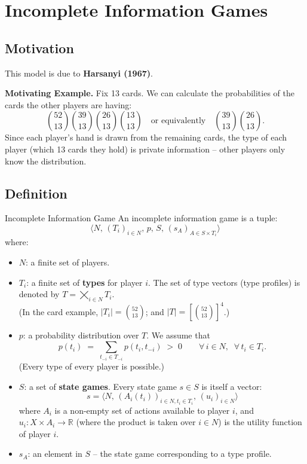 \documentclass[12pt, a4paper]{article}
\begin{document}
\section{Incomplete Information Games}

\subsection{Motivation}

This model is due to \textbf{Harsanyi (1967)}.

\medskip
\noindent\textbf{Motivating Example.} Fix 13 cards. We can calculate the probabilities of the cards the other players are having:
\[
  \binom{52}{13}\binom{39}{13}\binom{26}{13}\binom{13}{13}
  \quad\text{or equivalently}\quad
  \binom{39}{13}\binom{26}{13}.
\]
Since each player's hand is drawn from the remaining cards, the type of each player (which 13 cards they hold) is private information -- other players only know the distribution.

\subsection{Definition}

\begin{defbox}{Incomplete Information Game}
An incomplete information game is a tuple:
\[
  \bigl\langle N,\, (T_i)_{i \in N},\, p,\, S,\, (s_A)_{A \in S \times T_i} \bigr\rangle
\]
where:
\begin{itemize}
  \item $N$: a finite set of players.
  \item $T_i$: a finite set of \textbf{types} for player $i$. The set of type vectors (type profiles) is denoted by $T = \bigtimes_{i \in N} T_i$.\\
    (In the card example, $|T_i| = \binom{52}{13}$; and $|T| = \left[\binom{52}{13}\right]^4$.)
  \item $p$: a probability distribution over $T$. We assume that
    \[
      p(t_i) \;=\; \sum_{t_{-i} \in T_{-i}} p(t_i, t_{-i}) \;>\; 0
      \qquad \forall\, i \in N,\;\; \forall\, t_i \in T_i.
    \]
    (Every type of every player is possible.)
  \item $S$: a set of \textbf{state games}. Every state game $s \in S$ is itself a vector:
    \[
      s = \bigl\langle N,\, (A_i(t_i))_{i \in N, t_i \in T_i},\, (u_i)_{i \in N} \bigr\rangle
    \]
    where $A_i$ is a non-empty set of actions available to player $i$, and $u_i : X \times A_i \to \mathbb{R}$ (where the product is taken over $i \in N$) is the utility function of player $i$.
  \item $s_A$: an element in $S$ -- the state game corresponding to a type profile.
\end{itemize}
\end{defbox}
\end{document}
